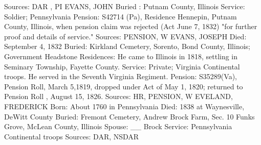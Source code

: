 Sources: DAR , PI 
EVANS, JOHN 
Buried : Putnam County, Illinois 
Service: Soldier; Pennsylvania 
Pension: S42714 (Pa), Residence Hennepin, Putnam County, Illinois, when pen­sion claim was rejected (Act June 7, 1832) "for further proof and details of service." 
Sources: PENSION, W 
EVANS, JOSEPH 
Died: September 4, 1832 
Buried: Kirkland Cemetery, Sorento,  Bond County, Illinois; Government Headstone 
Residences: He came to Illinois in 1818, settling in Seminary Township, Fayette County. 
Service: Private; Virginia Continental troops. He served in the Seventh Virginia Regiment. 
Pension: S35289(Va), Pension Roll, March 5,1819, dropped under Act of May 1, 1820; returned to Pension Roll , August 15, 1826. 
Sources: HR, PENSION, W 
EVELAND, FREDERICK 
Born: About 1760 in Pennsylvania 
Died: 1838 at Waynesville, DeWitt County 
Buried: Fremont Cemetery, Andrew Brock Farm, Sec. 10 Funks Grove, McLean County, Illinois Spouse: __ Brock 
Service: Pennsylvania Continental troops 
Sources: DAR, NSDAR 


